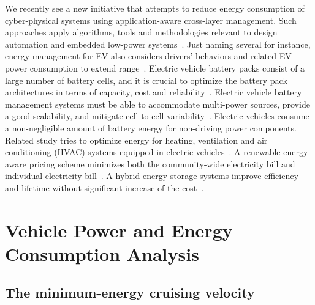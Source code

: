\documentclass{IEEEtran}
\begin{document}
We recently see a new initiative that attempts to reduce energy consumption of cyber-physical systems using application-aware cross-layer management. Such approaches apply algorithms, tools and methodologies relevant to design automation and embedded low-power systems~\cite{Seshia:TCAD17}. 
Just naming several for instance, energy management for EV also considers drivers' behaviors and related EV power consumption to extend range~\cite{Vatanparvar:TSG18,Vatanparvar:TODAES17}.
Electric vehicle battery packs consist of a large number of battery cells, and it is crucial to optimize the battery pack architectures in terms of capacity, cost and reliability~\cite{Wu:TCAD13,Shaheer:RTCSA17}. 
Electric vehicle battery management systems must be able to accommodate multi-power sources, provide a good scalability, and mitigate cell-to-cell variability~\cite{Shin:TCAD15}.
Electric vehicles consume a non-negligible amount of battery energy for non-driving power components. Related study tries to optimize energy for heating, ventilation and air conditioning (HVAC) systems equipped in electric vehicles~\cite{Zhao:ICCAD15,Vatanparvar:TECS18}. 
A renewable energy aware pricing scheme minimizes both the community-wide electricity bill and individual electricity bill~\cite{Liu:TPDS17}.
A hybrid energy storage systems improve efficiency and lifetime without significant increase of the cost~\cite{Xie:TCAD13, Kim:JPS14}. 




\section{Vehicle Power and Energy Consumption Analysis} \label{sec:energy consumption}

\subsection{The minimum-energy cruising velocity} \label{subsec:opt-cruising}
\end{document}
